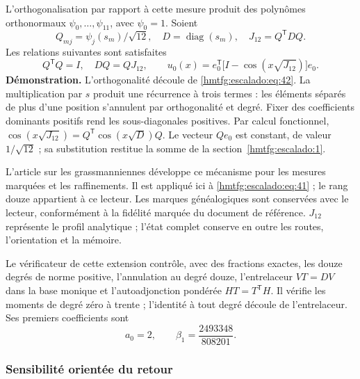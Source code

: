 L’orthogonalisation par rapport à cette mesure produit des polynômes orthonormaux \(\psi_0,\ldots,\psi_{11}\), avec \(\psi_0=1\). Soient
\[
Q_{mj}=\psi_j(s_m)/\sqrt{12},\quad
D=\operatorname{diag}(s_m),\quad J_{12}=Q^{\mathsf T}DQ.
\]
Les relations suivantes sont satisfaites
\begin{equation}
Q^{\mathsf T}Q=I,\quad DQ=QJ_{12},\qquad
\boxed{u_0(x)=e_0^{\mathsf T}
\bigl[I-\cos(x\sqrt{J_{12}})\bigr]e_0.}
\label{hmtfg:escalado:eq:43}
\end{equation}
\textbf{Démonstration.} L’orthogonalité découle de \eqref{hmtfg:escalado:eq:42}. La multiplication par \(s\) produit une récurrence à trois termes : les éléments séparés de plus d’une position s’annulent par orthogonalité et degré. Fixer des coefficients dominants positifs rend les sous-diagonales positives. Par calcul fonctionnel,
\(\cos(x\sqrt{J_{12}})=Q^{\mathsf T}\cos(x\sqrt D)Q\).
Le vecteur \(Qe_0\) est constant, de valeur \(1/\sqrt{12}\) ; sa substitution restitue la somme de la section~\ref{hmtfg:escalado:1}.

L’article sur les grassmanniennes développe ce mécanisme pour les mesures marquées et les raffinements. Il est appliqué ici à \eqref{hmtfg:escalado:eq:41} ; le rang douze appartient à ce lecteur. Les marques généalogiques sont conservées avec le lecteur, conformément à la fidélité marquée du document de référence. \(J_{12}\) représente le profil analytique ; l’état complet conserve en outre les routes, l’orientation et la mémoire.

Le vérificateur de cette extension contrôle, avec des fractions exactes, les douze degrés de norme positive, l’annulation au degré douze, l’entrelaceur \(VT=DV\) dans la base monique et l’autoadjonction pondérée \(HT=T^{\mathsf T}H\). Il vérifie les moments de degré zéro à trente ; l’identité à tout degré découle de l’entrelaceur. Ses premiers coefficients sont
\begin{equation}
a_0=2,\qquad \beta_1=\frac{2493348}{808201}.
\label{hmtfg:escalado:eq:44}
\end{equation}

\subsubsection{Sensibilité orientée du retour}
\label{hmtfg:escalado:14.3}

